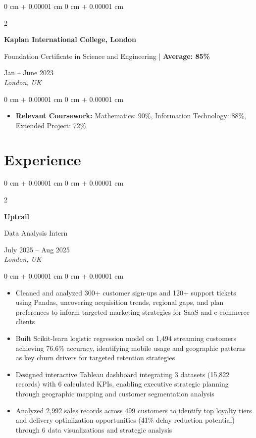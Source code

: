 \documentclass[10pt, a4paper]{article}
\newenvironment{highlights}{
    \begin{itemize}[
        topsep=0.10 cm,
        parsep=0.10 cm,
        partopsep=0pt,
        itemsep=0pt,
        leftmargin=20pt
    ]
}{
    \end{itemize}
} %
\newenvironment{onecolentry}{
    \begin{adjustwidth}{
        0 cm + 0.00001 cm
    }{
        0 cm + 0.00001 cm
    }
}{
    \end{adjustwidth}
} %
\newenvironment{twocolentry}[2][]{
    \onecolentry
    \def\secondColumn{#2}
    \setcolumnwidth{\fill, 4.5 cm}
    \begin{paracol}{2}
}{
    \switchcolumn \raggedleft \secondColumn
    \end{paracol}
    \endonecolentry
} %
\begin{document}
    \begin{twocolentry}{
        Jan -- June 2023 \\
        \textit{London, UK}
    }
        \textbf{Kaplan International College, London}

        Foundation Certificate in Science and Engineering | \textbf{Average: 85\%}
    \end{twocolentry}

    \vspace{0.10 cm}
    \begin{onecolentry}
        \begin{highlights}
            \item \textbf{Relevant Coursework:} Mathematics: 90\%, Information Technology: 88\%, Extended Project: 72\%
        \end{highlights}
    \end{onecolentry}


    \section{Experience}

    \begin{twocolentry}{
        July 2025 -- Aug 2025 \\
        \textit{London, UK}
    }
        \textbf{Uptrail}
        
        Data Analysis Intern
    \end{twocolentry}

    \vspace{0.10 cm}
    \begin{onecolentry}
        \begin{highlights}
            \item Cleaned and analyzed 300+ customer sign-ups and 120+ support tickets using Pandas, uncovering acquisition trends, regional gaps, and plan preferences to inform targeted marketing strategies for SaaS and e-commerce clients
            \item Built Scikit-learn logistic regression model on 1,494 streaming customers achieving 76.6\% accuracy, identifying mobile usage and geographic patterns as key churn drivers for targeted retention strategies
            \item Designed interactive Tableau dashboard integrating 3 datasets (15,822 records) with 6 calculated KPIs, enabling executive strategic planning through geographic mapping and customer segmentation analysis
            \item Analyzed 2,992 sales records across 499 customers to identify top loyalty tiers and delivery optimization opportunities (41\% delay reduction potential) through 6 data visualizations and strategic analysis
        \end{highlights}
    \end{onecolentry}
\end{document}

